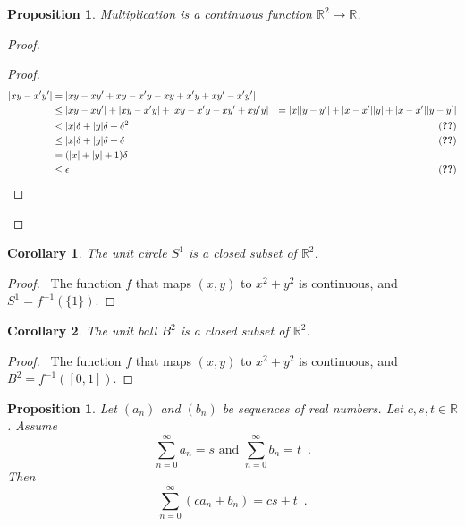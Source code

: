 \documentclass{book}
\let\qed\relax
\newtheorem{prop}[ax]{Proposition}
\newtheorem{cor}{Corollary}[ax]
\theoremstyle{definition}
\newcommand{\inv}[1]{\ensuremath{{#1}^{-1}}}
\begin{document}
\begin{prop}
\label{prop:multiply_continuous}
Multiplication is a continuous function $\mathbb{R}^2 \rightarrow \mathbb{R}$.
\end{prop}

\begin{proof}
\pf
{}
\begin{proof}
	\pf
	\begin{align*}
		|xy - x'y'| & = |xy - xy' + xy - x'y - xy + x'y + xy' - x'y'| \\
		& \leq |xy-xy'| + |xy-x'y| + |xy-x'y-xy'+xy'y|
		& = |x||y-y'| + |x-x'||y| + |x-x'||y-y'| \\
		& < |x|\delta + |y|\delta + \delta^2 & (\text{\stepref{4}}) \\
		& \leq |x|\delta + |y|\delta + \delta & (\text{\stepref{2}}) \\
		& = (|x| + |y| + 1) \delta \\
		& \leq \epsilon & (\text{\stepref{2}})
	\end{align*}
\end{proof}
\qed
\end{proof}

\begin{cor}
The unit circle $S^1$ is a closed subset of $\mathbb{R}^2$.
\end{cor}

\begin{proof}
\pf\ The function $f$ that maps $(x,y)$ to $x^2 + y^2$ is continuous, and $S^1 = \inv{f}(\{1\})$. \qed
\end{proof}

\begin{cor}
The unit ball $B^2$ is a closed subset of $\mathbb{R}^2$.
\end{cor}

\begin{proof}
\pf\ The function $f$ that maps $(x,y)$ to $x^2 + y^2$ is continuous, and $B^2 = \inv{f}([0,1])$. \qed
\end{proof}

\begin{prop}
Let $(a_n)$ and $(b_n)$ be sequences of real numbers. Let $c,s,t \in \mathbb{R}$. Assume
\[ \sum_{n=0}^\infty a_n = s \text{ and } \sum_{n=0}^\infty b_n = t \enspace . \]
Then
\[ \sum_{n=0}^\infty (c a_n + b_n) = cs + t \enspace . \]
\end{prop}
\end{document}
